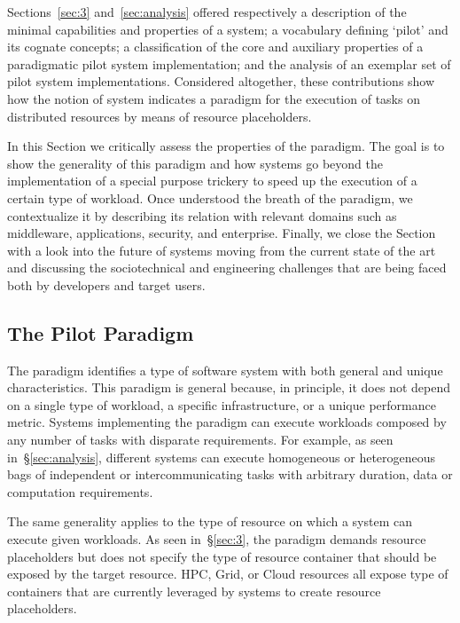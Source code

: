 \documentclass{sig-alternate}
\begin{document}

Sections~\ref{sec:3} and~\ref{sec:analysis} offered respectively a description
of the minimal capabilities and properties of a \pilot system; a
vocabulary defining `pilot' and its cognate concepts; a classification
of the core and auxiliary properties of a paradigmatic pilot system
implementation; and the analysis of an exemplar set of pilot system
implementations. Considered altogether, these contributions show how the
notion of \pilot system indicates a paradigm for the execution of tasks
on distributed resources by means of resource placeholders.

In this Section we critically assess the properties of the \pilot
paradigm. The goal is to show the generality of this paradigm and how
\pilot systems go beyond the implementation of a special purpose
trickery to speed up the execution of a certain type of workload. Once
understood the breath of the \pilot paradigm, we contextualize it
by describing its relation with relevant domains such as middleware,
applications, security, and enterprise. Finally, we close the Section
with a look into the future of \pilot systems moving from the current
state of the art and discussing the sociotechnical and engineering
challenges that are being faced both by developers and target users.

\subsection{The Pilot Paradigm}
\label{sec:5.1}

The \pilot paradigm identifies a type of software system with both
general and unique characteristics. This paradigm is general because, in
principle, it does not depend on a single type of workload, a specific
infrastructure, or a unique performance metric. Systems implementing the
\pilot paradigm can execute workloads composed by any number of
tasks with disparate requirements. For example, as seen
in~\S\ref{sec:analysis}, different \pilot systems can execute homogeneous or
heterogeneous bags of independent or intercommunicating tasks with
arbitrary duration, data or computation requirements.

The same generality applies to the type of resource on which a \pilot
system can execute given workloads. As seen in~\S\ref{sec:3}, the
\pilot paradigm demands resource placeholders but does not specify the
type of resource container that should be exposed by the target
resource. HPC, Grid, or Cloud resources all expose type of containers
that are currently leveraged by \pilot systems to create resource
placeholders.
\end{document}
